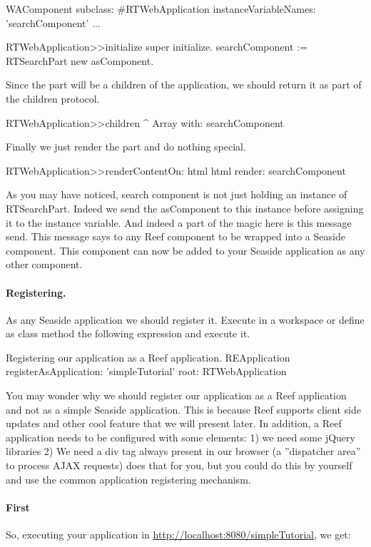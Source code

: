 \documentclass[a4paper,10pt,twoside]{book}
\begin{document}
\begin{code}{}
WAComponent subclass: #RTWebApplication
	instanceVariableNames: 'searchComponent'
	...
\end{code}


\begin{code}{}
RTWebApplication>>initialize
	super initialize.
	searchComponent := RTSearchPart new asComponent.
\end{code}

Since the part will be a children of the application, we should return it as part of the children protocol. 

\begin{code}{}
RTWebApplication>>children
	^ Array with: searchComponent
\end{code}

Finally we just render the part and do nothing special. 

\begin{code}{}
RTWebApplication>>renderContentOn: html
	html render: searchComponent
\end{code}

As you may have noticed, search component is not just holding an instance of RTSearchPart. Indeed we send the asComponent to this instance before assigning it to the instance variable. And indeed a part of the magic here is this  message send. This message says to any Reef component to be wrapped into a Seaside component. This component can now be added to your Seaside application as any other component.

\paragraph{Registering.} As any Seaside application we should register it. Execute in a workspace or define as class method the following expression and execute it. 

\begin{code}{Registering our application as a Reef application.}
REApplication 
	registerAsApplication: 'simpleTutorial'
	root: RTWebApplication
\end{code}


You may wonder why we should register our application as a Reef application and not as a simple Seaside application. This is because
Reef supports client side updates and other cool feature that we will present later. 
In addition, a Reef application needs to be configured with some elements: 1) we need some jQuery libraries 2) We need a div tag always present in our browser (a ''dispatcher area'' to process AJAX requests)  does that for you, but you could do this by yourself and use the common application registering mechanism.


\paragraph{First }

So, executing your application in \url{http://localhost:8080/simpleTutorial}, we get:





\ifx\wholebook\relax\else
   
   
\end{document}
